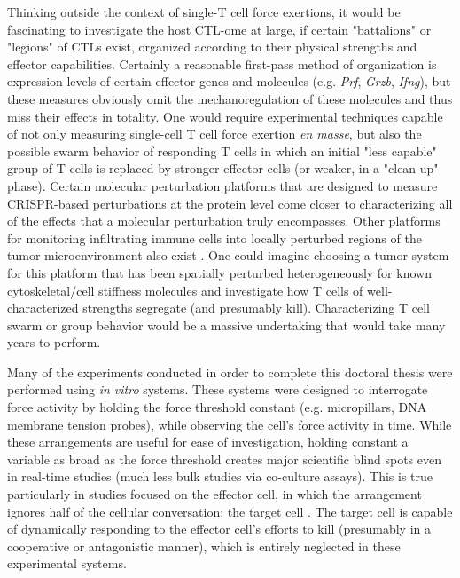 Thinking outside the context of single-T cell force exertions, it would be fascinating to investigate the host CTL-ome at large, if certain "battalions" or "legions" of CTLs exist, organized according to their physical strengths and effector capabilities. Certainly a reasonable first-pass method of organization is expression levels of certain effector genes and molecules (e.g. \textit{Prf}, \textit{Grzb}, \textit{Ifng}), but these measures obviously omit the  mechanoregulation of these molecules and thus miss their effects in totality. One would require  experimental techniques capable of not only measuring single-cell T cell force exertion \textit{en masse}, but also the possible swarm behavior of responding T cells in which an initial "less capable" group of T cells is replaced by stronger effector cells (or weaker, in a "clean up" phase). Certain molecular perturbation platforms that are designed to measure CRISPR-based perturbations at the protein level \cite{Wroblewska2018} come closer to characterizing all of the effects that a molecular perturbation truly encompasses. Other platforms for monitoring infiltrating immune cells into locally perturbed regions of the tumor microenvironment also exist \cite{MaximeDhainaut2021}. One could imagine choosing a tumor system for this platform that has been spatially perturbed heterogeneously for known cytoskeletal/cell stiffness molecules and investigate how T cells of well-characterized strengths segregate (and presumably kill). Characterizing T cell swarm or group behavior would be a massive undertaking that would take many years to perform.

Many of the experiments conducted in order to complete this doctoral thesis were performed using \textit{in vitro} systems. These systems were designed to interrogate force activity by holding the force threshold constant (e.g. micropillars, DNA membrane tension probes), while observing the cell's force activity in time. While these arrangements are useful for ease of investigation, holding constant a variable as broad as the force threshold creates major scientific blind spots even in real-time studies (much less bulk studies via co-culture assays). This is true particularly in studies focused on the effector cell, in which the arrangement ignores half of the cellular conversation: the target cell \cite{Tello-lafoz2021}. The target cell is capable of dynamically responding to the effector cell's efforts to kill (presumably in a cooperative or antagonistic manner), which is entirely neglected in these experimental systems. 

